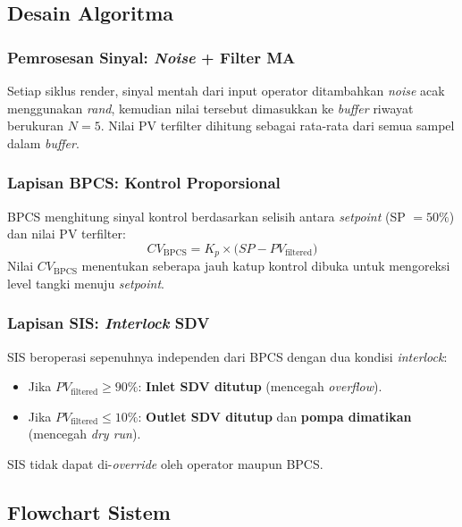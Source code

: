 \documentclass[12pt,a4paper]{article}
\begin{document}
\subsection{Desain Algoritma}

\subsubsection{Pemrosesan Sinyal: \textit{Noise} + Filter MA}
Setiap siklus render, sinyal mentah dari input operator ditambahkan
\textit{noise} acak menggunakan \textit{rand}, kemudian nilai tersebut
dimasukkan ke \textit{buffer} riwayat berukuran $N=5$. Nilai PV terfilter
dihitung sebagai rata-rata dari semua sampel dalam \textit{buffer}.

\subsubsection{Lapisan BPCS: Kontrol Proporsional}
BPCS menghitung sinyal kontrol berdasarkan selisih antara
\textit{setpoint} (SP $= 50\%$) dan nilai PV terfilter:
\begin{equation}
    CV_{\text{BPCS}} = K_p \times \bigl(SP - PV_{\text{filtered}}\bigr)
\end{equation}
Nilai $CV_{\text{BPCS}}$ menentukan seberapa jauh katup kontrol dibuka
untuk mengoreksi level tangki menuju \textit{setpoint}.

\subsubsection{Lapisan SIS: \textit{Interlock} SDV}
SIS beroperasi sepenuhnya independen dari BPCS dengan dua kondisi
\textit{interlock}:
\begin{itemize}
    \item Jika $PV_{\text{filtered}} \geq 90\%$: \textbf{Inlet SDV ditutup}
          (mencegah \textit{overflow}).
    \item Jika $PV_{\text{filtered}} \leq 10\%$: \textbf{Outlet SDV ditutup}
          dan \textbf{pompa dimatikan} (mencegah \textit{dry run}).
\end{itemize}
SIS tidak dapat di-\textit{override} oleh operator maupun BPCS.

\subsection{Flowchart Sistem}
\end{document}
